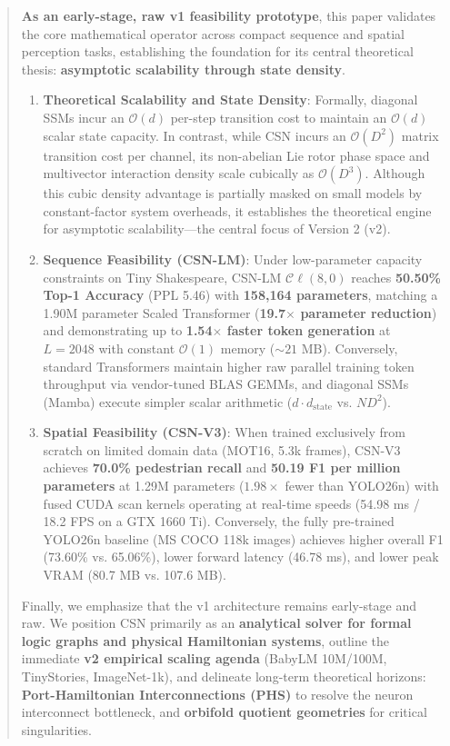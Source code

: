 \documentclass[11pt,a4paper]{article}
\newcommand{\Cl}{\mathcal{C}\ell}
\begin{document}
\begin{abstract}
\textbf{As an early-stage, raw v1 feasibility prototype}, this paper validates the core mathematical operator across compact sequence and spatial perception tasks, establishing the foundation for its central theoretical thesis: \textbf{asymptotic scalability through state density}.
\begin{enumerate}[leftmargin=*]
    \item \textbf{Theoretical Scalability and State Density}: Formally, diagonal SSMs incur an $\mathcal{O}(d)$ per-step transition cost to maintain an $\mathcal{O}(d)$ scalar state capacity. In contrast, while CSN incurs an $\mathcal{O}(D^2)$ matrix transition cost per channel, its non-abelian Lie rotor phase space and multivector interaction density scale cubically as $\mathcal{O}(D^3)$. Although this cubic density advantage is partially masked on small models by constant-factor system overheads, it establishes the theoretical engine for asymptotic scalability—the central focus of Version 2 (v2).
    \item \textbf{Sequence Feasibility (CSN-LM)}: Under low-parameter capacity constraints on Tiny Shakespeare, CSN-LM $\Cl(8, 0)$ reaches \textbf{50.50\% Top-1 Accuracy} (PPL 5.46) with \textbf{158,164 parameters}, matching a 1.90M parameter Scaled Transformer (\textbf{19.7$\times$ parameter reduction}) and demonstrating up to \textbf{1.54$\times$ faster token generation} at $L=2048$ with constant $\mathcal{O}(1)$ memory ($\sim 21$ MB). Conversely, standard Transformers maintain higher raw parallel training token throughput via vendor-tuned BLAS GEMMs, and diagonal SSMs (Mamba) execute simpler scalar arithmetic ($d \cdot d_{\mathrm{state}}$ vs. $N D^2$).
    \item \textbf{Spatial Feasibility (CSN-V3)}: When trained exclusively from scratch on limited domain data (MOT16, 5.3k frames), CSN-V3 achieves \textbf{70.0\% pedestrian recall} and \textbf{50.19 F1 per million parameters} at 1.29M parameters ($1.98\times$ fewer than YOLO26n) with fused CUDA scan kernels operating at real-time speeds (54.98 ms / 18.2 FPS on a GTX 1660 Ti). Conversely, the fully pre-trained YOLO26n baseline (MS COCO 118k images) achieves higher overall F1 (73.60\% vs. 65.06\%), lower forward latency (46.78 ms), and lower peak VRAM (80.7 MB vs. 107.6 MB).
\end{enumerate}
Finally, we emphasize that the v1 architecture remains early-stage and raw. We position CSN primarily as an \textbf{analytical solver for formal logic graphs and physical Hamiltonian systems}, outline the immediate \textbf{v2 empirical scaling agenda} (BabyLM 10M/100M, TinyStories, ImageNet-1k), and delineate long-term theoretical horizons: \textbf{Port-Hamiltonian Interconnections (PHS)} to resolve the neuron interconnect bottleneck, and \textbf{orbifold quotient geometries} for critical singularities.
\end{abstract}
\end{document}
